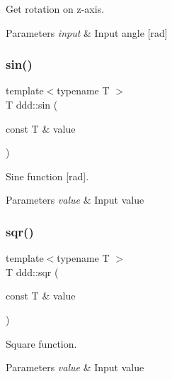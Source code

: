 Get rotation on z-\/axis. 


\begin{DoxyParams}{Parameters}
{\em input} & Input angle \mbox{[}rad\mbox{]} \\
\hline
\end{DoxyParams}
\mbox{\label{namespaceddd_a3c2355d52318b82d63a4ff3525bb651a}} 
\subsubsection{\texorpdfstring{sin()}{sin()}}
{\footnotesize\ttfamily template$<$typename T $>$ \\
T ddd\+::sin (\begin{DoxyParamCaption}\item[{const T \&}]{value }\end{DoxyParamCaption})\hspace{0.3cm}{\ttfamily [inline]}}



Sine function \mbox{[}rad\mbox{]}. 


\begin{DoxyParams}{Parameters}
{\em value} & Input value \\
\hline
\end{DoxyParams}
\mbox{\label{namespaceddd_a1d4703ab7fa9c58943ff44b368dacb4b}} 
\subsubsection{\texorpdfstring{sqr()}{sqr()}}
{\footnotesize\ttfamily template$<$typename T $>$ \\
T ddd\+::sqr (\begin{DoxyParamCaption}\item[{const T \&}]{value }\end{DoxyParamCaption})\hspace{0.3cm}{\ttfamily [inline]}}



Square function. 


\begin{DoxyParams}{Parameters}
{\em value} & Input value \\
\hline
\end{DoxyParams}
\mbox{\label{namespaceddd_a99ebeda8499ba29e0302f0f3c6e43549}} 
